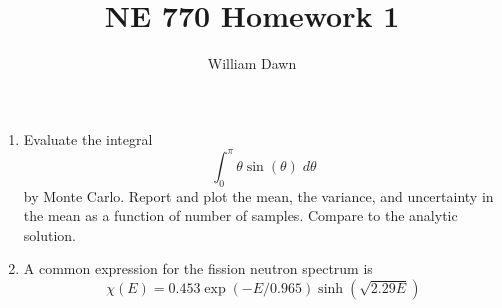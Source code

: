 \documentclass{article}
\title{NE 770 Homework 1}
\author{William Dawn}
\begin{document}
\maketitle

\begin{enumerate}
    \item Evaluate the integral
      \begin{equation}
          \int_0^{\pi} \theta \sin(\theta) \; d\theta
      \end{equation}
      by Monte Carlo. Report and plot the mean, the variance, and uncertainty in the mean as a function of number of samples. Compare to the analytic solution.
    \item A common expression for the fission neutron spectrum is 
      \begin{equation}
          \chi(E) = 0.453 \exp(-E/0.965) \sinh\left(\sqrt{2.29E}\right)
      \end{equation}
\end{enumerate}
\end{document}
